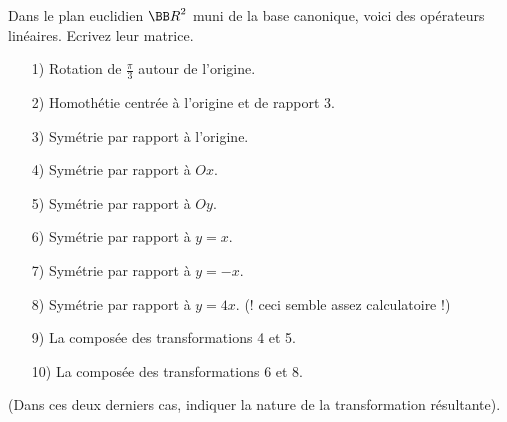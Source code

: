 \documentclass[12pt,french,oneside,a4paper]{memoir} %
\begin{document}
\begin{exo}
Dans le plan euclidien ${\BB R}^2$ muni de la base canonique, voici des 
opérateurs linéaires. Ecrivez leur matrice.
\begin{enumerate}
\item[ 1)] Rotation de $\frac{\pi}{3}$ autour de l'origine.
\item[ 2)] Homothétie centrée à l'origine et de rapport 3.
\item[ 3)] Symétrie par rapport à l'origine.
\item[ 4)] Symétrie par rapport à $Ox$.
\item[ 5)] Symétrie par rapport à $Oy$.
\item[ 6)] Symétrie par rapport à $y=x$.
\item[ 7)] Symétrie par rapport à $y=-x$.
\item[ 8)] Symétrie par rapport à $y=4x$. (! ceci semble assez calculatoire !)
\item[ 9)] La composée des transformations 4 et 5.
\item[10)] La composée des transformations 6 et 8.
\end{enumerate}
(Dans ces deux derniers cas, indiquer la nature de la transformation 
résultante).
\end{exo}
\end{document}
